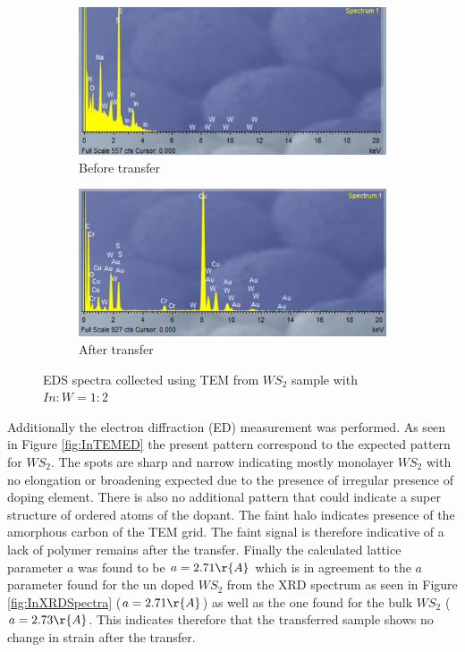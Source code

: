 \begin{figure}[!ht]
	\begin{center}
			\begin{subfigure}[b]{0.6\textwidth}
			\includegraphics[width=\textwidth]{In/TEMEDSFra.png}
			\caption{Before transfer}
			\label{fig:InTEMEDSFra}
		\end{subfigure}
		\qquad
		\begin{subfigure}[b]{0.6\textwidth}
			\includegraphics[width=\textwidth]{In/TEMEDS.png}
			\caption{After transfer}
			\label{fig:InTEMEDS}
		\end{subfigure}
		\caption{EDS spectra collected using TEM from $WS_2$ sample with $In:W = 1:2$}
		\label{fig:InTEMEDSSpectra}
	\end{center}
\end{figure}

Additionally the electron diffraction (ED) measurement was performed. As seen in Figure \ref{fig:InTEMED} the present pattern correspond to the expected pattern for $WS_2$. The spots are sharp and narrow indicating mostly monolayer $WS_2$ with no elongation or broadening expected due to the presence of irregular presence of doping element. There is also no additional pattern that could indicate a super structure of ordered atoms of the dopant. The faint halo indicates presence of the amorphous carbon of the TEM grid. The faint signal is therefore indicative of a lack of polymer remains after the transfer. Finally the calculated lattice parameter $a$ was found to be $a = 2.71 \r{A}$ which is in agreement to the $a$ parameter found for the un doped $WS_2$ from the XRD spectrum as seen in Figure \ref{fig:InXRDSpectra} ($a = 2.71 \r{A}$) as well as the  one found for the bulk $WS_2$ ($a = 2.73 \r{A}$. This indicates therefore that the transferred sample shows no change in strain after the transfer.

